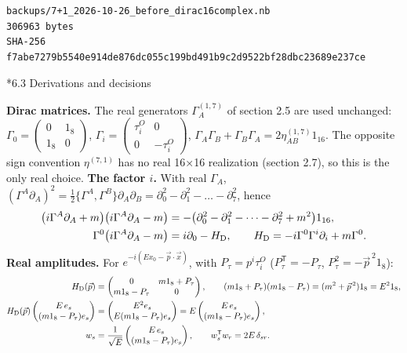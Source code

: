 \documentclass[10pt,a4paper]{article}
\makeatletter
\renewcommand\subsection{\@startsection{subsection}{2}{\z@}{-3.25ex\@plus -1ex \@minus -.2ex}{1.5ex \@plus .2ex}{\normalfont\large\bfseries\raggedright}}
\makeatother
\begin{document}
\begin{Verbatim}[fontsize=\small,frame=single,framesep=2mm]
backups/7+1_2026-10-26_before_dirac16complex.nb
306963 bytes
SHA-256 f7abe7279b5540e914de876dc055c199bd491b9c2d9522bf28dbc23689e237ce
\end{Verbatim}
\subsection*{6.3 Derivations and decisions}
\textbf{Dirac matrices.} The real generators $\Gamma^{(1,7)}_A$ of section 2.5 are used unchanged: $\Gamma_0=\left(\begin{smallmatrix}0&1_8\\1_8&0\end{smallmatrix}\right)$, $\Gamma_i=\left(\begin{smallmatrix}\tau^{O}_i&0\\0&-\tau^{O}_i\end{smallmatrix}\right)$, $\Gamma_A\Gamma_B+\Gamma_B\Gamma_A=2\eta^{(1,7)}_{AB}1_{16}$. The opposite sign convention $\eta^{(7,1)}$ has no real 16×16 realization (section 2.7), so this is the only real choice. \textbf{The factor $i$.} With real $\Gamma_A$, $(\Gamma^A\partial_A)^2=\frac12\lbrace\Gamma^A,\Gamma^B\rbrace\partial_A\partial_B=\partial_0^2-\partial_1^2-\dots-\partial_7^2$, hence
\begin{align*}
\big(i\Gamma^{A}\partial_A+m\big)\big(i\Gamma^{A}\partial_A-m\big)&=-\big(\partial_0^2-\partial_1^2-\dots-\partial_7^2+m^2\big)1_{16}, \\
\Gamma^0\big(i\Gamma^{A}\partial_A-m\big)&=i\partial_0-H_{\rm D},\qquad H_{\rm D}=-i\Gamma^0\Gamma^i\partial_i+m\Gamma^0 .
\end{align*}
\textbf{Real amplitudes.} For $e^{-i(Ex_0-\vec p\cdot\vec x)}$, with $P_\tau=p^i\tau^{O}_i$ ($P_\tau^{\mathsf T}=-P_\tau$, $P_\tau^2=-\vec p^{\,2}1_8$):
\begin{align*}
H_{\rm D}(\vec p)&=\begin{pmatrix}0&m1_8+P_\tau\\m1_8-P_\tau&0\end{pmatrix},\qquad (m1_8+P_\tau)(m1_8-P_\tau)=(m^2+\vec p^{\,2})1_8=E^21_8, \\
H_{\rm D}(\vec p)\begin{pmatrix}E\,e_s\\(m1_8-P_\tau)e_s\end{pmatrix}&=\begin{pmatrix}E^2e_s\\E(m1_8-P_\tau)e_s\end{pmatrix}=E\begin{pmatrix}E\,e_s\\(m1_8-P_\tau)e_s\end{pmatrix}, \\
w_s&=\frac1{\sqrt E}\begin{pmatrix}E\,e_s\\(m1_8-P_\tau)e_s\end{pmatrix},\qquad w_s^{\mathsf T}w_r=2E\,\delta_{sr}.
\end{align*}
\end{document}
